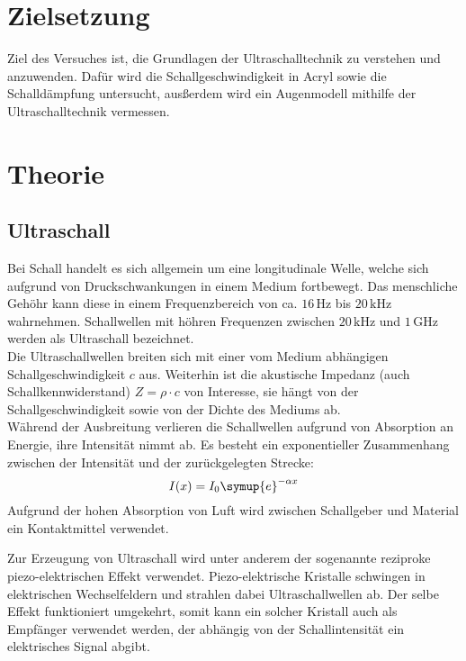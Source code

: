 \section{Zielsetzung}
Ziel des Versuches ist, die Grundlagen der Ultraschalltechnik zu verstehen und anzuwenden.
Dafür wird die Schallgeschwindigkeit in Acryl sowie die Schalldämpfung untersucht, ausßerdem
wird ein Augenmodell mithilfe der Ultraschalltechnik vermessen.

\section{Theorie}
\label{sec:Theorie}

\subsection{Ultraschall}
\label{sec:Ultraschall}

Bei Schall handelt es sich allgemein um eine longitudinale Welle, welche sich aufgrund von Druckschwankungen
in einem Medium fortbewegt.
Das menschliche Gehöhr kann diese in einem Frequenzbereich von ca. $16\,\unit{\hertz}$ bis $20\,\unit{\kilo\hertz}$
wahrnehmen. Schallwellen mit höhren Frequenzen zwischen $20\,\unit{\kilo\hertz}$ und $1\,\unit{\giga\hertz}$ werden als
Ultraschall bezeichnet. \\
Die Ultraschallwellen breiten sich mit einer vom Medium abhängigen Schallgeschwindigkeit $c$ aus.
Weiterhin ist die akustische Impedanz (auch Schallkennwiderstand) $Z=\rho \cdot c$ von Interesse, sie hängt
von der Schallgeschwindigkeit sowie von der Dichte des Mediums ab. \\
Während der Ausbreitung verlieren die Schallwellen aufgrund von Absorption an Energie, ihre Intensität nimmt ab.
Es besteht ein exponentieller Zusammenhang zwischen der Intensität und der zurückgelegten Strecke:
\begin{equation}
    \label{eq:Dämpfung}
    I(x)=I_{0}\symup{e}^{-\alpha x}
\end{equation}
Aufgrund der hohen Absorption von Luft wird zwischen Schallgeber und Material ein Kontaktmittel verwendet.

Zur Erzeugung von Ultraschall wird unter anderem der sogenannte reziproke piezo-elektrischen Effekt verwendet.
Piezo-elektrische Kristalle schwingen in elektrischen Wechselfeldern und strahlen dabei Ultraschallwellen ab.
Der selbe Effekt funktioniert umgekehrt, somit kann ein solcher Kristall auch als Empfänger verwendet werden,
der abhängig von der Schallintensität ein elektrisches Signal abgibt.

